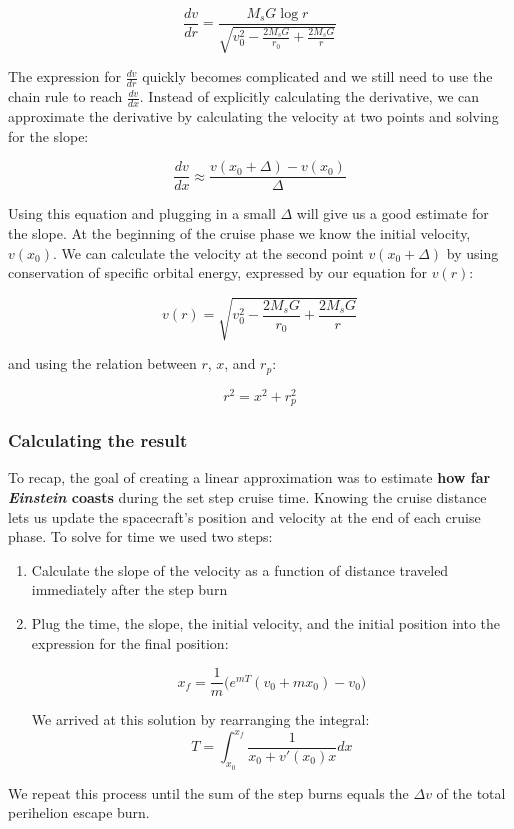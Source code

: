 \documentclass[12pt]{article} %
\begin{document}
$$\frac{dv}{dr} = \frac{M_sG \log{r}}{ \sqrt{v_0^2-\frac{2M_sG}{r_0} + \frac{2M_sG}{r}}}$$

The expression for $\frac{dv}{dr}$ quickly becomes complicated and we still need to use the chain rule to reach $\frac{dv}{dx}$. Instead of explicitly calculating the derivative, we can approximate the derivative by calculating the velocity at two points and solving for the slope:

$$\frac{dv}{dx} \approx \frac{v(x_0 +\Delta) - v(x_0)}{\Delta}$$

Using this equation and plugging in a small $\Delta$ will give us a good estimate for the slope. At the beginning of the cruise phase we know the initial velocity, $v(x_0)$. We can calculate the velocity at the second point $v(x_0 + \Delta)$ by using conservation of specific orbital energy, expressed by our equation for $v(r)$:

$$v(r) = \sqrt{v_0^2-\frac{2M_sG}{r_0} + \frac{2M_sG}{r}}$$

and using the relation between $r$, $x$, and $r_p$:

$$r^2 = x^2 + r_p^2$$

\subsubsection{Calculating the result}
To recap, the goal of creating a linear approximation was to estimate  \textbf{how far \textit{Einstein} coasts} during the set step cruise time. Knowing the cruise distance lets us update the spacecraft's position and velocity at the end of each cruise  phase. To solve for time we used two steps:
\begin{enumerate}
\item Calculate the slope of the velocity as a function of distance traveled immediately after the step burn
\item Plug the time, the slope, the initial velocity, and the initial position into the expression for the final position:

$$\boxed{x_f = \frac{1}{m}\bigg(e^{mT}(v_0+mx_0) - v_0\bigg)}$$

We arrived at this solution by rearranging the integral:
$$\boxed{T = \int_{x_0}^{x_f} \frac{1}{x_0+v'(x_0)x} dx}$$
\end{enumerate}

We repeat this process until the sum of the step burns equals the $\Delta v$ of the total perihelion escape burn. 
\end{document}
